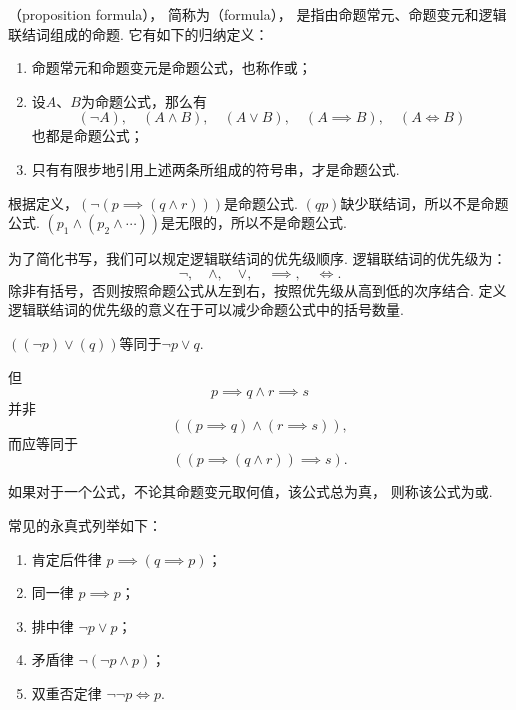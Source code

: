 \begin{definition}
（proposition formula），%
简称为（formula），%
是指由命题常元、命题变元和逻辑联结词组成的命题.
它有如下的归纳定义：
\begin{enumerate}
\item 命题常元和命题变元是命题公式，也称作或；
\item 设\(A\)、\(B\)为命题公式，那么有\[
(\neg A),\quad
(A \land B),\quad
(A \lor B),\quad
(A \implies B),\quad
(A \iff B)
\]也都是命题公式；
\item 只有有限步地引用上述两条所组成的符号串，才是命题公式.
\end{enumerate}
\end{definition}

\begin{example}
根据定义，\((\neg(p \implies (q \land r)))\)是命题公式.
\((qp)\)缺少联结词，所以不是命题公式.
\((p_1 \land (p_2 \land \dotsb))\)是无限的，所以不是命题公式.
\end{example}

为了简化书写，我们可以规定逻辑联结词的优先级顺序.
逻辑联结词的优先级为：\[
\neg,\quad \land,\quad \lor,\quad \implies,\quad \iff.
\]除非有括号，否则按照命题公式从左到右，按照优先级从高到低的次序结合.
定义逻辑联结词的优先级的意义在于可以减少命题公式中的括号数量.

\begin{example}
\(((\neg p) \lor (q))\)等同于\(\neg p \lor q\).

但\[
	p \implies q \land r \implies s
\]并非\[
	((p \implies q) \land (r \implies s)),
\]而应等同于\[
	((p \implies (q \land r)) \implies s).
\]
\end{example}

\begin{definition}
如果对于一个公式，不论其命题变元取何值，该公式总为真，%
则称该公式为或.
\end{definition}

常见的永真式列举如下：\begin{enumerate}
\item 肯定后件律 \(p \implies (q \implies p)\)；
\item 同一律 \(p \implies p\)；
\item 排中律 \(\neg p \lor p\)；
\item 矛盾律 \(\neg(\neg p \land p)\)；
\item 双重否定律 \(\neg\neg p \iff p\).
\end{enumerate}



